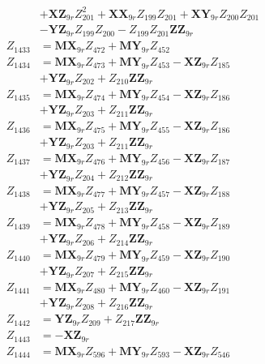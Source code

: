 \begin{multicols}{2}
\begin{align}
&+ \mathbf{XZ}_{9r}Z_{201}^2 + \mathbf{XX}_{9r}Z_{199}Z_{201} + \mathbf{XY}_{9r}Z_{200}Z_{201}  \nonumber \\
&- \mathbf{YZ}_{9r}Z_{199}Z_{200} - Z_{199}Z_{201}\mathbf{ZZ}_{9r} \nonumber \\
Z_{1433} &= \mathbf{MX}_{9r}Z_{472} + \mathbf{MY}_{9r}Z_{452} \nonumber \\
Z_{1434} &= \mathbf{MX}_{9r}Z_{473} + \mathbf{MY}_{9r}Z_{453} - \mathbf{XZ}_{9r}Z_{185}  \nonumber \\
&+ \mathbf{YZ}_{9r}Z_{202} + Z_{210}\mathbf{ZZ}_{9r} \nonumber \\
Z_{1435} &= \mathbf{MX}_{9r}Z_{474} + \mathbf{MY}_{9r}Z_{454} - \mathbf{XZ}_{9r}Z_{186}  \nonumber \\
&+ \mathbf{YZ}_{9r}Z_{203} + Z_{211}\mathbf{ZZ}_{9r} \nonumber \\
Z_{1436} &= \mathbf{MX}_{9r}Z_{475} + \mathbf{MY}_{9r}Z_{455} - \mathbf{XZ}_{9r}Z_{186}  \nonumber \\
&+ \mathbf{YZ}_{9r}Z_{203} + Z_{211}\mathbf{ZZ}_{9r} \nonumber \\
Z_{1437} &= \mathbf{MX}_{9r}Z_{476} + \mathbf{MY}_{9r}Z_{456} - \mathbf{XZ}_{9r}Z_{187}  \nonumber \\
&+ \mathbf{YZ}_{9r}Z_{204} + Z_{212}\mathbf{ZZ}_{9r} \nonumber \\
Z_{1438} &= \mathbf{MX}_{9r}Z_{477} + \mathbf{MY}_{9r}Z_{457} - \mathbf{XZ}_{9r}Z_{188}  \nonumber \\
&+ \mathbf{YZ}_{9r}Z_{205} + Z_{213}\mathbf{ZZ}_{9r} \nonumber \\
Z_{1439} &= \mathbf{MX}_{9r}Z_{478} + \mathbf{MY}_{9r}Z_{458} - \mathbf{XZ}_{9r}Z_{189}  \nonumber \\
&+ \mathbf{YZ}_{9r}Z_{206} + Z_{214}\mathbf{ZZ}_{9r} \nonumber \\
Z_{1440} &= \mathbf{MX}_{9r}Z_{479} + \mathbf{MY}_{9r}Z_{459} - \mathbf{XZ}_{9r}Z_{190}  \nonumber \\
&+ \mathbf{YZ}_{9r}Z_{207} + Z_{215}\mathbf{ZZ}_{9r} \nonumber \\
Z_{1441} &= \mathbf{MX}_{9r}Z_{480} + \mathbf{MY}_{9r}Z_{460} - \mathbf{XZ}_{9r}Z_{191}  \nonumber \\
&+ \mathbf{YZ}_{9r}Z_{208} + Z_{216}\mathbf{ZZ}_{9r} \nonumber \\
Z_{1442} &= \mathbf{YZ}_{9r}Z_{209} + Z_{217}\mathbf{ZZ}_{9r} \nonumber \\
Z_{1443} &= -\mathbf{XZ}_{9r} \nonumber \\
Z_{1444} &= \mathbf{MX}_{9r}Z_{596} + \mathbf{MY}_{9r}Z_{593} - \mathbf{XZ}_{9r}Z_{546}  \nonumber \\

\end{align}
\end{multicols}
